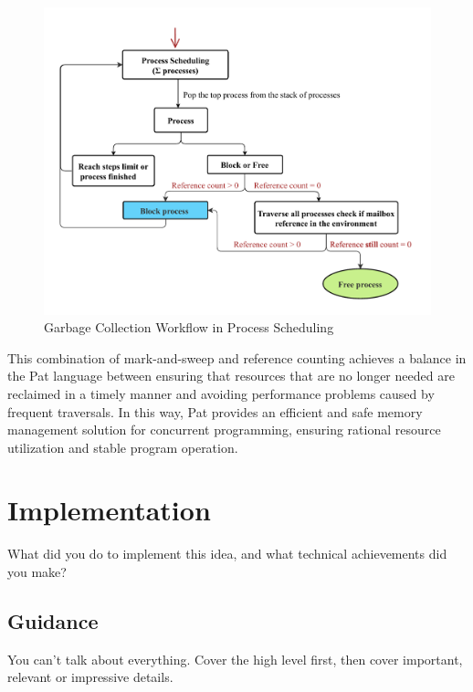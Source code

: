 \documentclass{l4proj}
\begin{document}
\begin{figure}[h]
    \centering
    \includegraphics[width=0.8\linewidth]{dissertation/images/gc.pdf}    
    \caption{ 
    Garbage Collection Workflow in Process Scheduling
    }
    \label{fig:gc1} 
\end{figure}



This combination of mark-and-sweep and reference counting achieves a balance in the Pat language between ensuring that resources that are no longer needed are reclaimed in a timely manner and avoiding performance problems caused by frequent traversals. In this way, Pat provides an efficient and safe memory management solution for concurrent programming, ensuring rational resource utilization and stable program operation.















\chapter{Implementation}
What did you do to implement this idea, and what technical achievements did you make?
\section{Guidance}
You can't talk about everything. Cover the high level first, then cover important, relevant or impressive details.
\end{document}

